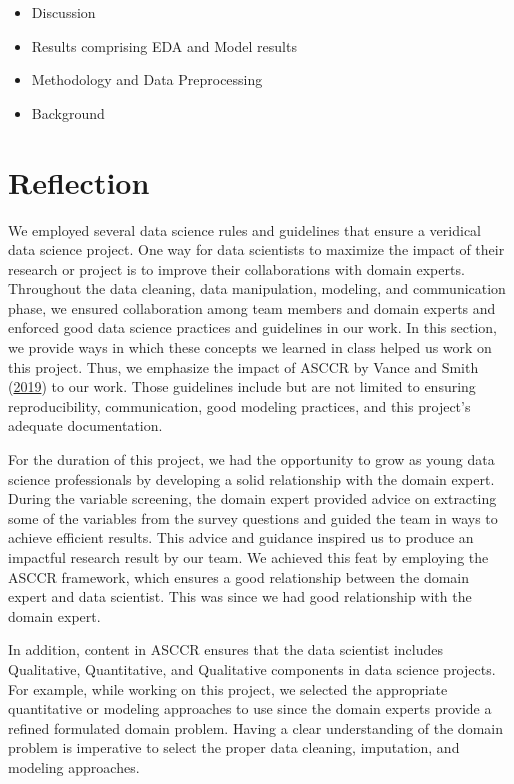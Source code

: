 \documentclass[
  10pt,
]{article}
\begin{document}
\begin{itemize}
\item
  Discussion
\item
  Results comprising EDA and Model results
\item
  Methodology and Data Preprocessing
\item
  Background
\end{itemize}

\newpage

\hypertarget{reflection}{%
\section{Reflection}\label{reflection}}

We employed several data science rules and guidelines that ensure a veridical data science project. One way for data scientists to maximize the impact of their research or project is to improve their collaborations with domain experts. Throughout the data cleaning, data manipulation, modeling, and communication phase, we ensured collaboration among team members and domain experts and enforced good data science practices and guidelines in our work. In this section, we provide ways in which these concepts we learned in class helped us work on this project. Thus, we emphasize the impact of ASCCR by Vance and Smith (\protect\hyperlink{ref-vance2019asccr}{2019}) to our work. Those guidelines include but are not limited to ensuring reproducibility, communication, good modeling practices, and this project's adequate documentation.

For the duration of this project, we had the opportunity to grow as young data science professionals by developing a solid relationship with the domain expert. During the variable screening, the domain expert provided advice on extracting some of the variables from the survey questions and guided the team in ways to achieve efficient results. This advice and guidance inspired us to produce an impactful research result by our team. We achieved this feat by employing the ASCCR framework, which ensures a good relationship between the domain expert and data scientist. This was since we had good relationship with the domain expert.

In addition, content in ASCCR ensures that the data scientist includes Qualitative, Quantitative, and Qualitative components in data science projects. For example, while working on this project, we selected the appropriate quantitative or modeling approaches to use since the domain experts provide a refined formulated domain problem. Having a clear understanding of the domain problem is imperative to select the proper data cleaning, imputation, and modeling approaches.
\end{document}
